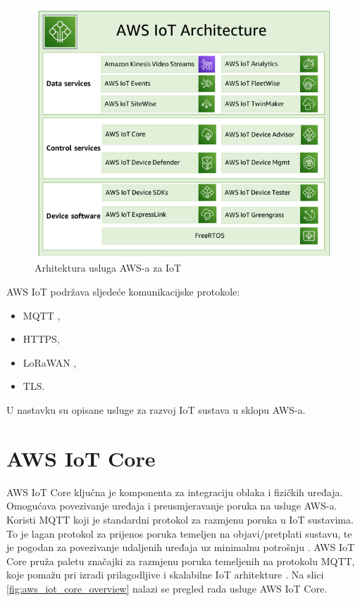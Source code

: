 \begin{figure}[ht]
	\centering
	\includegraphics[scale=0.8]{imgs/aws_iot_arch}
	\caption{Arhitektura usluga AWS-a za IoT \cite{aws_docs}}
	\label{fig:aws_iot_arch}
\end{figure}

AWS IoT podržava sljedeće komunikacijske protokole:
\begin{itemize}
	\item MQTT ,
	\item HTTPS,
	\item LoRaWAN ,
	\item TLS.
\end{itemize}

U nastavku su opisane usluge za razvoj IoT sustava u sklopu AWS-a.

\section{AWS IoT Core}

AWS IoT Core ključna je komponenta za integraciju oblaka i fizičkih uređaja. Omogućava povezivanje uređaja i preusmjeravanje poruka na usluge AWS-a. Koristi MQTT koji je standardni protokol za razmjenu poruka u IoT sustavima. To je lagan  protokol za prijenos poruka temeljen na objavi/pretplati sustavu, te je pogodan za povezivanje udaljenih uređaja uz minimalnu potrošnju \cite{what_is_mqtt}. AWS IoT Core pruža paletu značajki za razmjenu poruka temeljenih na protokolu MQTT, koje pomažu pri izradi prilagodljive i skalabilne IoT arhitekture \cite{aws_docs}. Na slici \ref{fig:aws_iot_core_overview} nalazi se pregled rada usluge AWS IoT Core.

